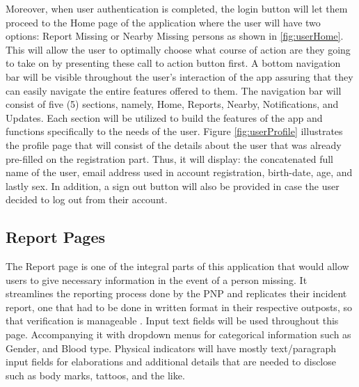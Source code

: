Moreover, when user authentication is completed, the login button will let them proceed to the Home page of the application where the user will have two options: Report Missing or Nearby Missing persons as shown in \ref{fig:userHome}. This will allow the user to optimally choose what course of action are they going to take on by presenting these call to action button first. A bottom navigation bar will be visible throughout the user’s interaction of the app assuring that they can easily navigate the entire features offered to them. The navigation bar will consist of five (5) sections, namely, Home, Reports, Nearby, Notifications, and Updates. Each section will be utilized to build the features of the app and functions specifically to the needs of the user. Figure \ref{fig:userProfile} illustrates the profile page that will consist of the details about the user that was already pre-filled on the registration part. Thus, it will display: the concatenated full name of the user, email address used in account registration, birth-date, age, and lastly sex. In addition, a sign out button will also be provided in case the user decided to log out from their account.


\subsection{Report Pages}

The Report page is one of the integral parts of this application that would allow users to give necessary information in the event of a person missing. It streamlines the reporting process done by the PNP and replicates their incident report, one that had to be done in written format in their respective outposts, so that verification is manageable \cite{NationalPoliceCommission}. Input text fields will be used throughout this page. Accompanying it with dropdown menus for categorical information such as Gender, and Blood type. Physical indicators will have mostly text/paragraph input fields for elaborations and additional details that are needed to disclose such as body marks, tattoos, and the like.

